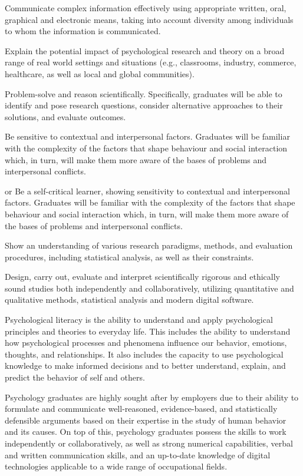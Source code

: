 \documentclass[
  11pt,
  letterpaper,
  oneside,
  open=any]{scrbook}
\begin{document}
Communicate complex information effectively using appropriate written,
oral, graphical and electronic means, taking into account diversity
among individuals to whom the information is communicated.

Explain the potential impact of psychological research and theory on a
broad range of real world settings and situations (e.g., classrooms,
industry, commerce, healthcare, as well as local and global
communities).

Problem-solve and reason scientifically. Specifically, graduates will be
able to identify and pose research questions, consider alternative
approaches to their solutions, and evaluate outcomes.

Be sensitive to contextual and interpersonal factors. Graduates will be
familiar with the complexity of the factors that shape behaviour and
social interaction which, in turn, will make them more aware of the
bases of problems and interpersonal conflicts.

or Be a self-critical learner, showing sensitivity to contextual and
interpersonal factors. Graduates will be familiar with the complexity of
the factors that shape behaviour and social interaction which, in turn,
will make them more aware of the bases of problems and interpersonal
conflicts.

Show an understanding of various research paradigms, methods, and
evaluation procedures, including statistical analysis, as well as their
constraints.

Design, carry out, evaluate and interpret scientifically rigorous and
ethically sound studies both independently and collaboratively,
utilizing quantitative and qualitative methods, statistical analysis and
modern digital software.

Psychological literacy is the ability to understand and apply
psychological principles and theories to everyday life. This includes
the ability to understand how psychological processes and phenomena
influence our behavior, emotions, thoughts, and relationships. It also
includes the capacity to use psychological knowledge to make informed
decisions and to better understand, explain, and predict the behavior of
self and others.

Psychology graduates are highly sought after by employers due to their
ability to formulate and communicate well-reasoned, evidence-based, and
statistically defensible arguments based on their expertise in the study
of human behavior and its causes. On top of this, psychology graduates
possess the skills to work independently or collaboratively, as well as
strong numerical capabilities, verbal and written communication skills,
and an up-to-date knowledge of digital technologies applicable to a wide
range of occupational fields.
\end{document}
